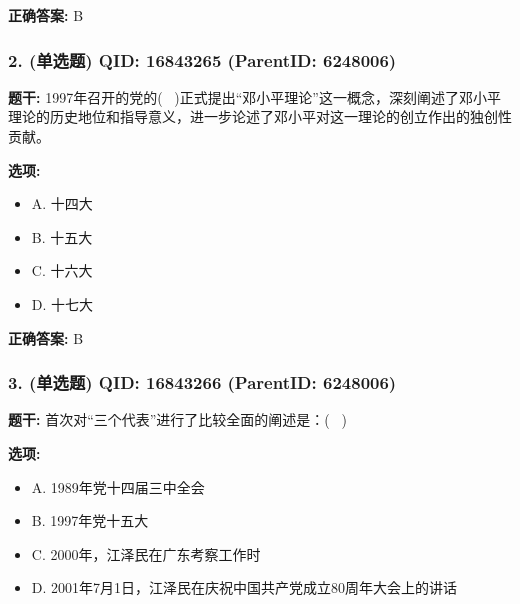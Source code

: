 \documentclass[12pt,UTF8]{ctexart}
\begin{document}
\textbf{正确答案:}
B

\vspace{0.3em}\hrulefill\vspace{0.7em}

\subsubsection*{2. (单选题) \small QID: 16843265 (ParentID: 6248006)}

\textbf{题干:}
1997年召开的党的(  )正式提出“邓小平理论”这一概念，深刻阐述了邓小平理论的历史地位和指导意义，进一步论述了邓小平对这一理论的创立作出的独创性贡献。



\textbf{选项:}
\begin{itemize}[leftmargin=*]

  \item A. 十四大

  \item B. 十五大

  \item C. 十六大

  \item D. 十七大

\end{itemize}

\textbf{正确答案:}
B

\vspace{0.3em}\hrulefill\vspace{0.7em}

\subsubsection*{3. (单选题) \small QID: 16843266 (ParentID: 6248006)}

\textbf{题干:}
首次对“三个代表”进行了比较全面的阐述是：(  )



\textbf{选项:}
\begin{itemize}[leftmargin=*]

  \item A. 1989年党十四届三中全会

  \item B. 1997年党十五大

  \item C. 2000年，江泽民在广东考察工作时

  \item D. 2001年7月1日，江泽民在庆祝中国共产党成立80周年大会上的讲话

\end{itemize}
\end{document}
